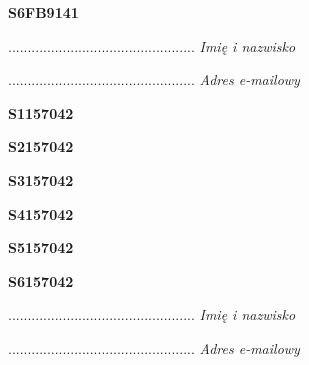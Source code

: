 \begin{turn}{90}\huge \textbf{S6FB9141}\end{turn}

\begin{turn}{90}\begin{minipage}{\linewidth} \vspace{20mm} ................................................  \textit{Imię i nazwisko}\end{minipage}\end{turn}

\begin{turn}{90}\begin{minipage}{\linewidth} \vspace{20mm} ................................................  \textit{Adres e-mailowy}\end{minipage}\end{turn}

\begin{turn}{90}\huge \textbf{S1157042}\end{turn}

\begin{turn}{90}\huge \textbf{S2157042}\end{turn}

\begin{turn}{90}\huge \textbf{S3157042}\end{turn}

\begin{turn}{90}\huge \textbf{S4157042}\end{turn}

\begin{turn}{90}\huge \textbf{S5157042}\end{turn}

\begin{turn}{90}\huge \textbf{S6157042}\end{turn}

\begin{turn}{90}\begin{minipage}{\linewidth} \vspace{20mm} ................................................  \textit{Imię i nazwisko}\end{minipage}\end{turn}

\begin{turn}{90}\begin{minipage}{\linewidth} \vspace{20mm} ................................................  \textit{Adres e-mailowy}\end{minipage}\end{turn}

